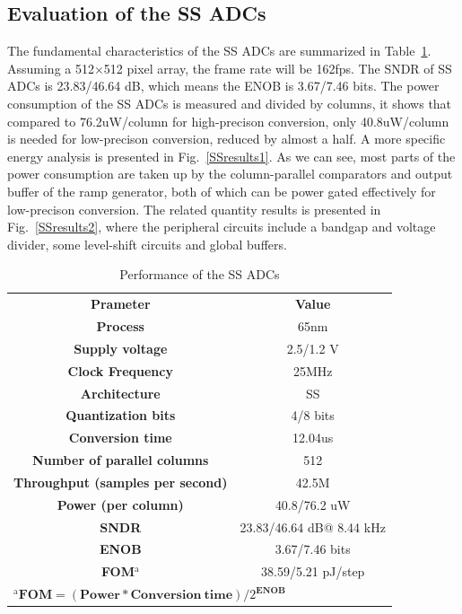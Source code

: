 \documentclass[conference]{IEEEtran}
\begin{document}
\subsection{Evaluation of the SS ADCs}

The fundamental characteristics of the SS ADCs are summarized in Table~\ref{tab1}. Assuming a 512×512 pixel array, the frame rate will be 162fps.
The SNDR of SS ADCs is 23.83/46.64 dB, which means the ENOB is 3.67/7.46 bits. 
The power consumption of the SS ADCs is measured and divided by columns, 
it shows that compared to 76.2uW/column for high-precison conversion, only 40.8uW/column is needed for low-precison conversion, reduced by almost a half. 
A more specific energy analysis is presented in Fig.~\ref{SSresults1}. 
As we can see, most parts of the power consumption are taken up by the column-parallel comparators and output buffer of the ramp generator, 
both of which can be power gated effectively for low-precison conversion. 
The related quantity results is presented in Fig.~\ref{SSresults2}, 
where the peripheral circuits include a bandgap and voltage divider, some level-shift circuits and global buffers.

\begin{table}[htbp]
	\caption{Performance of the SS ADCs}
	\begin{center}
		\begin{tabular}{|c|c|}
			\hline
			\textbf{Prameter}& \textbf{Value} \\
			\hhline{|==|}
			\textbf{Process}& 65nm \\
			\hline 
		    \textbf{Supply voltage}& 2.5/1.2 V \\
		    \hline
		    \textbf{Clock Frequency}&	25MHz \\
		    \hline
		    \textbf{Architecture}&	SS \\
		    \hline
		    \textbf{Quantization bits}&	4/8 bits\\
		    \hline
		    \textbf{Conversion time}&	12.04us \\
		    \hline
		    \textbf{Number of parallel columns}&	512 \\
		    \hline
		    \textbf{Throughput (samples per second)}&	42.5M \\ 
		    \hline
		    \textbf{Power (per column)}&	40.8/76.2 uW \\
		    \hline
		    \textbf{SNDR}& 23.83/46.64 dB@ 8.44 kHz\\
		    \hline
			\textbf{ENOB}& 3.67/7.46 bits\\
			\hline
		    \textbf{FOM$^{\mathrm{a}}$}& 38.59/5.21 pJ/step\\
		    \hline
		    \multicolumn{2}{l}{$^{\mathrm{a}}\textbf{FOM}=(\textbf{Power}\ast \textbf{Conversion}\ \textbf{time})/2^{\textbf{ENOB}}$ }	    
		\end{tabular}
		\label{tab1}
	\end{center}
\end{table}
\end{document}
